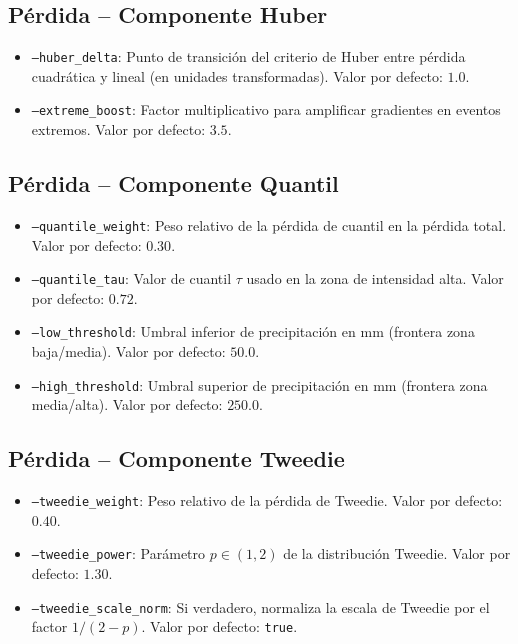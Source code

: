 \subsection*{Pérdida -- Componente Huber}

\begin{itemize}
    \item \texttt{--huber\_delta}: Punto de transición del criterio de Huber entre pérdida cuadrática y lineal (en unidades transformadas). Valor por defecto: $1.0$.
    
    \item \texttt{--extreme\_boost}: Factor multiplicativo para amplificar gradientes en eventos extremos. Valor por defecto: $3.5$.
\end{itemize}

\subsection*{Pérdida -- Componente Quantil}

\begin{itemize}
    \item \texttt{--quantile\_weight}: Peso relativo de la pérdida de cuantil en la pérdida total. Valor por defecto: $0.30$.
    
    \item \texttt{--quantile\_tau}: Valor de cuantil $\tau$ usado en la zona de intensidad alta. Valor por defecto: $0.72$.
    
    \item \texttt{--low\_threshold}: Umbral inferior de precipitación en mm (frontera zona baja/media). Valor por defecto: $50.0$.
    
    \item \texttt{--high\_threshold}: Umbral superior de precipitación en mm (frontera zona media/alta). Valor por defecto: $250.0$.
\end{itemize}

\subsection*{Pérdida -- Componente Tweedie}

\begin{itemize}
    \item \texttt{--tweedie\_weight}: Peso relativo de la pérdida de Tweedie. Valor por defecto: $0.40$.
    
    \item \texttt{--tweedie\_power}: Parámetro $p \in (1,2)$ de la distribución Tweedie. Valor por defecto: $1.30$.
    
    \item \texttt{--tweedie\_scale\_norm}: Si verdadero, normaliza la escala de Tweedie por el factor $1/(2-p)$. Valor por defecto: \texttt{true}.
\end{itemize}


